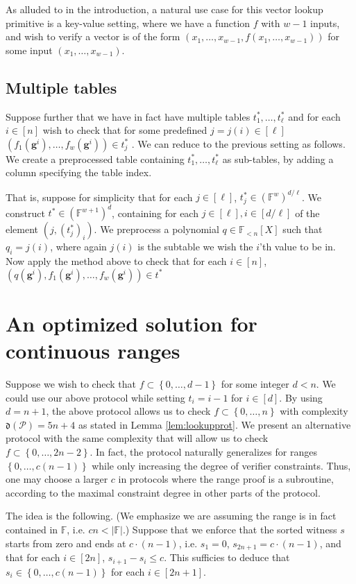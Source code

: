 \documentclass[11pt]{article} %
\newcommand{\F}{\ensuremath{\mathbb F}\xspace}
\newcommand{\set}[1]{\ensuremath{\left\{#1\right\}}\xspace}
\newcommand{\hgen}{\ensuremath{\mathbf{g}}\xspace}
\newcommand{\polysofdeg}[1]{\ensuremath{\F_{< #1}[X]}\xspace}
\newcommand{\prot}{\ensuremath{\mathscr{P}}\xspace}
\newcommand{\aggdeg}[1]{\ensuremath{\mathfrak{d}(#1)}\xspace}
\begin{document}
As alluded to in the introduction, a natural use case for this vector lookup primitive is a key-value setting, where we have a function $f$ with $w-1$ inputs,
and wish to verify a vector is of the form $(x_1,\ldots,x_{w-1},f(x_1,\ldots,x_{w-1}))$ for some input $(x_1,\ldots,x_{w-1})$.

\subsection{Multiple tables}
Suppose further that we have in fact have multiple tables $t^*_1,\ldots, t^*_\ell$
and for each $i\in [n]$ wish to check that for some predefined $j=j(i)\in [\ell]$  $(f_1(\hgen^i),\ldots,f_w(\hgen^i))\in t^*_j$ .
We can reduce to the previous setting as follows.
We create a preprocessed table containing $t^*_1,\ldots, t^*_\ell$ as sub-tables, by adding a column specifying the table index.

That is, suppose for simplicity that for each $j\in [\ell]$, $t^*_j\in (\F^{w})^{d/\ell}$.
We construct $t^*\in (\F^{w+1})^d$, 
containing for each $j\in [\ell], i\in [d/\ell]$ of the element
$(j,(t^*_j)_i)$.
We preprocess a polynomial $q\in \polysofdeg{n}$
such that $q_i =j(i)$, where again $j(i)$ is the subtable we wish the $i$'th value to be in.
Now apply the method above to check that for each $i\in [n]$,
$(q(\hgen^i),f_1(\hgen^i),\ldots,f_w(\hgen^i))\in t^*$

\section{An optimized solution for continuous ranges}\label{sec:ranges}
Suppose we wish to check that $f \subset \set{0,\ldots,d-1}$ for some integer $d< n$.
We could use our above protocol while setting $t_i = i-1$ for $i\in [d]$.
By using $d=n+1$, the above protocol allows us to check $f\subset \set{0,\ldots,n}$ with complexity $\aggdeg{\prot}=5n+4$ as stated in Lemma \ref{lem:lookupprot}. 
We present an alternative protocol with the same complexity that will allow us to check $f\subset \set{0,\ldots,2n-2}$.
In fact, the protocol naturally generalizes for ranges $\set{0,\ldots,c(n-1)}$ while only increasing the degree of verifier constraints. Thus, one may choose a larger $c$ in protocols where the range proof is a subroutine, according to the maximal constraint degree in other parts of the protocol.


The idea is the following. (We emphasize we are assuming the range is in fact contained in \F, i.e. $cn < |\F|$.)
Suppose that we enforce that the sorted witness $s$ starts from zero and ends at $c\cdot (n-1)$, i.e. $s_1=0$, $s_{2n+1} = c\cdot (n-1)$, and that for each $i\in [2n]$, $s_{i+1}-s_i \leq c$.
This sufficies to deduce that $s_i \in \set{0,\ldots,c(n-1)}$ for each $i\in [2n+1]$.
\end{document}

